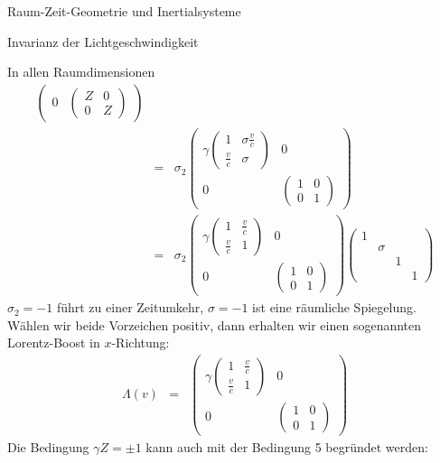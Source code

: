 \begin{chapter}{\titlestr}
\begin{section}{Raum-Zeit-Geometrie und Inertialsysteme}
\begin{subsection}{Invarianz der Lichtgeschwindigkeit}
\begin{subsubsection}{In allen Raumdimensionen}
\begin{eqnarray*}
\begin{pmatrix}
0 & \begin{pmatrix}
Z & 0\\
0 & Z
\end{pmatrix}
\end{pmatrix}\\
&=&
\sigma_2
\begin{pmatrix}
\gamma
\begin{pmatrix}
1 & \sigma\frac{v}{c}\\
\frac{v}{c} & \sigma
\end{pmatrix} & 0\\
0 & \begin{pmatrix}
1& 0\\
0 & 1
\end{pmatrix}
\end{pmatrix}\\
&=&
\sigma_2
\begin{pmatrix}
\gamma
\begin{pmatrix}
1 & \frac{v}{c}\\
\frac{v}{c} & 1
\end{pmatrix} & 0\\
0 & \begin{pmatrix}
1& 0\\
0 & 1
\end{pmatrix}
\end{pmatrix}
\begin{pmatrix}
1 & & & \\
 & \sigma& &\\
& & 1 &\\
& & & 1
\end{pmatrix}
\end{eqnarray*}
$\sigma_2=-1$ führt zu einer Zeitumkehr, $\sigma=-1$ ist eine räumliche Spiegelung.
Wählen wir beide Vorzeichen positiv, dann erhalten wir einen sogenannten Lorentz-Boost in $x$-Richtung:
\begin{eqnarray*}
\Lambda(v) &=&
\begin{pmatrix}
\gamma
\begin{pmatrix}
1 & \frac{v}{c}\\
\frac{v}{c} & 1
\end{pmatrix} & 0\\
0 & \begin{pmatrix}
1& 0\\
0 & 1
\end{pmatrix}
\end{pmatrix}
\end{eqnarray*}
Die Bedingung $\gamma Z=\pm 1$ kann auch mit der Bedingung 5 begründet werden:

\end{subsubsection}
\end{subsection}
\end{section}
\end{chapter}
